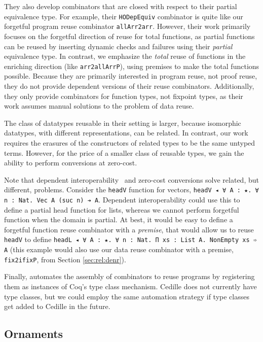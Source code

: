 \documentclass[acmsmall]{acmart}\settopmatter{}
\newcommand{\refsec}[1]{Section \ref{sec:#1}}
\begin{document}
They also develop combinators that are closed with respect to their
partial equivalence type. For example, their \verb;HODepEquiv; combinator is
quite like our forgetful program reuse combinator
\verb;allArr2arr;. However, their work primarily focuses on the
forgetful direction of reuse for total functions, as partial functions
can be reused by inserting dynamic checks and failures using their
\textit{partial} equivalence type. In contrast, we emphasize the
\textit{total} reuse of functions in the enriching direction (like
\verb;arr2allArrP;), using premises to make the total functions
possible. Because they are primarily interested in program reuse, not
proof reuse, they do not provide dependent versions of their reuse
combinators. Additionally, they only provide combinators for function
types, not fixpoint types, as their work assumes manual solutions to
the problem of data reuse.

The class of datatypes reusable in their setting is larger, because
isomorphic datatypes, with different representations, can be
related. In contrast, our work requires the erasures of the
constructors of related types to be the same untyped terms. However,
for the price of a smaller class of reusable types, we gain the
ability to perform conversions at zero-cost.

Note that dependent interoperability~\cite{dagand:interopfoundations}
and zero-cost conversions solve
related, but different, problems. Consider the \verb;headV; function
for vectors, \texttt{headV ◂ ∀ A : ★. ∀ n : Nat. Vec A (suc n) ➔ A}.
Dependent interoperability could use this to define a partial head
function for lists, whereas we cannot perform forgetful function
when the domain is partial. At best, it would be easy to define a
forgetful function reuse combinator with a \textit{premise}, that would allow
us to reuse \verb;headV; to define
\verb;headL ◂ ∀ A : ★. ∀ n : Nat. Π xs : List A. NonEmpty xs ➾ A;
(this example would also use our data reuse combinator with a premise,
\verb;fix2ifixP;, from \refsec{rel:denr}).

Finally, \citet{dagand:interop} automates the assembly of combinators
to reuse programs by registering them as instances of Coq's type
class mechanism. Cedille does not currently have type classes, but we could
employ the same automation strategy if type classes get added to
Cedille in the future.

\subsection{Ornaments}
\end{document}

